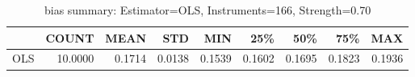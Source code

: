 \begin{table}[ht]
\centering
\caption{bias summary: Estimator=OLS, Instruments=166, Strength=0.70}
\begin{tabular}{lrrrrrrrr}
\toprule
 & COUNT & MEAN & STD & MIN & 25\% & 50\% & 75\% & MAX \\
\midrule
OLS & 10.0000 & 0.1714 & 0.0138 & 0.1539 & 0.1602 & 0.1695 & 0.1823 & 0.1936 \\
\bottomrule
\end{tabular}
\end{table}
